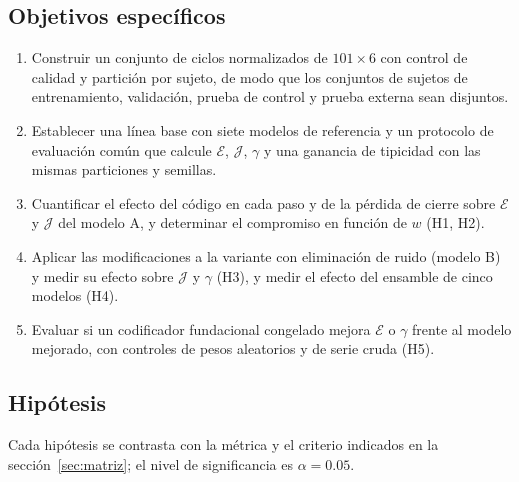 \documentclass[11pt,a4paper]{article}
\begin{document}
\subsection{Objetivos específicos}

\begin{enumerate}[label=\textbf{O\arabic*.},leftmargin=2.2em]
\item Construir un conjunto de ciclos normalizados de $101\times 6$ con control de calidad y partición por sujeto, de modo que los conjuntos de sujetos de entrenamiento, validación, prueba de control y prueba externa sean disjuntos.
\item Establecer una línea base con siete modelos de referencia y un protocolo de evaluación común que calcule $\mathcal E$, $\mathcal J$, $\gamma$ y una ganancia de tipicidad con las mismas particiones y semillas.
\item Cuantificar el efecto del código en cada paso y de la pérdida de cierre sobre $\mathcal E$ y $\mathcal J$ del modelo A, y determinar el compromiso en función de $w$ (H1, H2).
\item Aplicar las modificaciones a la variante con eliminación de ruido (modelo B) y medir su efecto sobre $\mathcal J$ y $\gamma$ (H3), y medir el efecto del ensamble de cinco modelos (H4).
\item Evaluar si un codificador fundacional congelado mejora $\mathcal E$ o $\gamma$ frente al modelo mejorado, con controles de pesos aleatorios y de serie cruda (H5).
\end{enumerate}

\subsection{Hipótesis}

Cada hipótesis se contrasta con la métrica y el criterio indicados en la sección~\ref{sec:matriz}; el nivel de significancia es $\alpha=0.05$.
\end{document}
